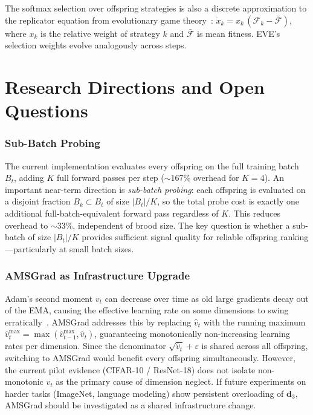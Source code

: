 \documentclass[12pt]{article}
\begin{document}
The softmax selection over offspring strategies is also a discrete
approximation to the replicator equation from evolutionary game
theory~\cite{taylor1978evolutionary}:
$\dot{x}_k = x_k\,(\mathcal{F}_k - \bar{\mathcal{F}})$,
where $x_k$ is the relative weight of strategy $k$ and
$\bar{\mathcal{F}}$ is mean fitness.
EVE's selection weights evolve analogously across steps.


\section{Research Directions and Open Questions}
\label{sec:discussion}

\subsubsection{Sub-Batch Probing}

The current implementation evaluates every offspring on the full
training batch $B_t$, adding $K$ full forward passes per step
($\sim$167\% overhead for $K = 4$).
An important near-term direction is \emph{sub-batch probing}: each
offspring is evaluated on a disjoint fraction $B_k \subset B_t$ of
size $|B_t|/K$, so the total probe cost is exactly one additional
full-batch-equivalent forward pass regardless of $K$.
This reduces overhead to $\sim$33\%, independent of brood size.
The key question is whether a sub-batch of size $|B_t|/K$ provides
sufficient signal quality for reliable offspring ranking---particularly
at small batch sizes.

\subsubsection{AMSGrad as Infrastructure Upgrade}

Adam's second moment $v_t$ can decrease over time as old large gradients
decay out of the EMA, causing the effective learning rate on some
dimensions to swing erratically~\cite{reddi2018convergence}.
AMSGrad addresses this by replacing $\hat{v}_t$ with the running
maximum $\hat{v}_t^{\max} = \max(\hat{v}_{t-1}^{\max}, \hat{v}_t)$,
guaranteeing monotonically non-increasing learning rates per dimension.
Since the denominator $\sqrt{\hat{v}_t} + \varepsilon$ is shared across
all offspring, switching to AMSGrad would benefit every offspring
simultaneously.
However, the current pilot evidence (CIFAR-10 / ResNet-18) does not
isolate non-monotonic $v_t$ as the primary cause of dimension neglect.
If future experiments on harder tasks (ImageNet, language modeling)
show persistent overloading of $\mathbf{d}_3$, AMSGrad should be
investigated as a shared infrastructure change.
\end{document}
